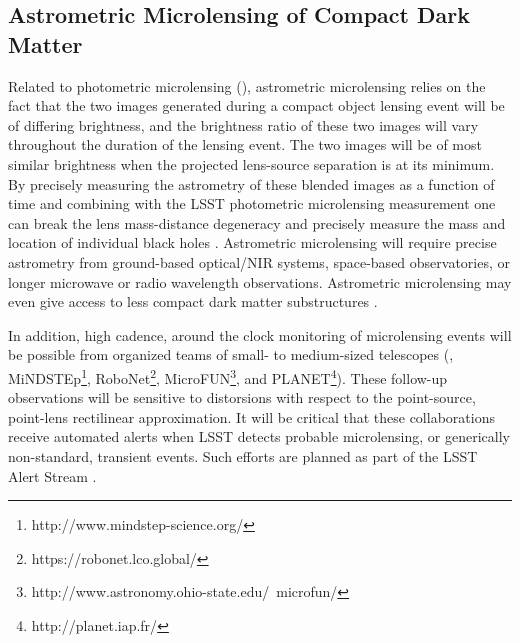 \subsection{Astrometric Microlensing of Compact Dark Matter }
\label{sec:astrometric_microlens}

Related to photometric microlensing (), astrometric microlensing relies on the fact that the two images generated during a compact object lensing event will be of differing brightness, and the brightness ratio of these two images will vary throughout the duration of the lensing event.
The two images will be of most similar brightness when the projected lens-source separation is at its minimum.
By precisely measuring the astrometry of these blended images as a function of time and combining with the LSST photometric microlensing measurement one can break the lens mass-distance degeneracy and precisely measure the mass and location of individual black holes \citep{2015ApJ...814L..11Y}.
Astrometric microlensing will require precise astrometry from ground-based optical/NIR systems, space-based observatories, or longer microwave or radio wavelength observations.
Astrometric microlensing may even give access to less compact dark matter substructures \citep{1804.01991}.

In addition, high cadence, around the clock monitoring of microlensing events will be possible from organized teams of small- to medium-sized telescopes (\eg, MiNDSTEp\footnote{http://www.mindstep-science.org/}, RoboNet\footnote{https://robonet.lco.global/}, MicroFUN\footnote{http://www.astronomy.ohio-state.edu/~microfun/}, and PLANET\footnote{http://planet.iap.fr/}). 
These follow-up observations will be sensitive to distorsions with respect to the point-source, point-lens rectilinear approximation.
It will be critical that these collaborations receive automated alerts when LSST detects probable microlensing, or generically non-standard, transient events. 
Such efforts are planned as part of the LSST Alert Stream \citep{0805.2366}.


